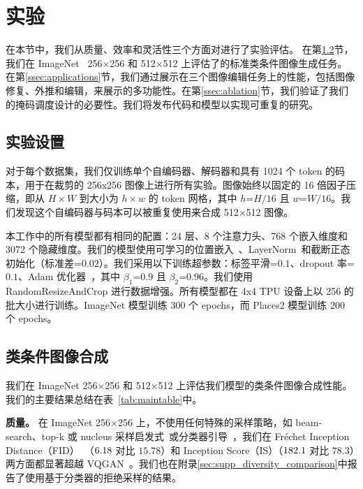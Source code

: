 
\section{实验}
\label{sec:experiments}

在本节中，我们从质量、效率和灵活性三个方面对\model 进行了实验评估。
在第\ref{ssec:class_conditional_synthesis}节，我们在 ImageNet~\cite{deng2009imagenet} 256$\times$256 和 512$\times$512 上评估了\model 的标准类条件图像生成任务。
在第\ref{ssec:applications}节，我们通过展示\model 在三个图像编辑任务上的性能，包括图像修复、外推和编辑，来展示\model 的多功能性。在第\ref{ssec:ablation}节，我们验证了我们的掩码调度设计的必要性。我们将发布代码和模型以实现可重复的研究。


\subsection{实验设置}
\label{ssec:architecture}

对于每个数据集，我们仅训练单个自编码器、解码器和具有 1024 个 token 的码本，用于在裁剪的 256x256 图像上进行所有实验。图像始终以固定的 16 倍因子压缩，即从 $H\times W$ 到大小为 $h \times w$ 的 token 网格，其中 $h$=$H / 16$ 且 $w$=$W/16$。我们发现这个自编码器与码本可以被重复使用来合成 512$\times$512 图像。

本工作中的所有模型都有相同的配置：24 层、8 个注意力头、768 个嵌入维度和 3072 个隐藏维度。我们的模型使用可学习的位置嵌入~\cite{Vaswani17attention}、LayerNorm~\cite{ba2016layer}和截断正态初始化（标准差=$0.02$）。我们采用以下训练超参数：标签平滑=$0.1$、dropout 率=$0.1$、Adam 优化器~\cite{kingma2014adam}，其中 $\beta_{1}$=$0.9$ 且 $\beta_{2}$=$0.96$。我们使用 RandomResizeAndCrop 进行数据增强。所有模型都在 4x4 TPU 设备上以 256 的批大小进行训练。ImageNet 模型训练 300 个 epochs，而 Places2 模型训练 200 个 epochs。 

\subsection{类条件图像合成}
\label{ssec:class_conditional_synthesis}

我们在 ImageNet 256$\times$256 和 512$\times$512 上评估我们模型的类条件图像合成性能。我们的主要结果总结在表~\ref{tab:maintable}中。

\noindent\textbf{质量。}
在 ImageNet 256$\times$256 上，不使用任何特殊的采样策略，如 beam-search、top-k 或 nucleus 采样启发式~\cite{holtzman2019nucleus}或分类器引导~\cite{Razavi19vqvae2}，我们在 Fréchet Inception Distance（FID）~\cite{FID}（$6.18$ 对比 $15.78$）和 Inception Score（IS）（$182.1$ 对比 $78.3$）两方面都显著超越 VQGAN~\cite{Esser21vqgan}。我们也在附录\ref{sec:supp_diversity_comparison}中报告了使用基于分类器的拒绝采样的结果。

